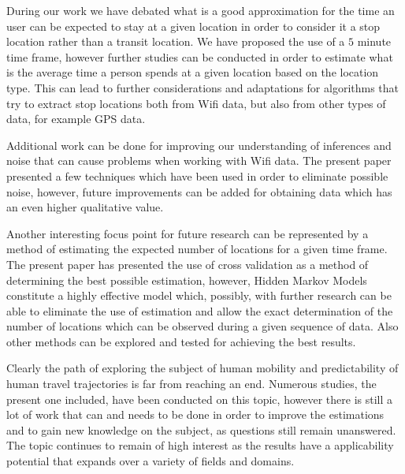 During our work we have debated what is a good approximation for the time an
user can be expected to stay at a given location in order to consider it a stop
location rather than a transit location. We have proposed the use of a $5$
minute time frame, however further studies can be conducted in order to estimate
what is the average time a person spends at a given location based on the
location type. This can lead to further considerations and adaptations for
algorithms that try to extract stop locations both from Wifi data, but also from
other types of data, for example GPS data.

Additional work can be done for improving our understanding of inferences and
noise that can cause problems when working with Wifi data. The present paper
presented a few techniques which have been used in order to eliminate possible
noise, however, future improvements can be added for obtaining data which has an
even higher qualitative value.

Another interesting focus point for future research can be represented by a
method of estimating the expected number of locations for a given time frame.
The present paper has presented the use of cross validation as a method of
determining the best possible estimation, however, Hidden Markov Models
constitute a highly effective model which, possibly, with further research can
be able to eliminate the use of estimation and allow the exact determination of
the number of locations which can be observed during a given sequence of data.
Also other methods can be explored and tested for achieving the best results.

Clearly the path of exploring the subject of human mobility and predictability
of human travel trajectories is far from reaching an end. Numerous studies, the
present one included, have been conducted on this topic, however there is still
a lot of work that can and needs to be done in order to improve the estimations
and to gain new knowledge on the subject, as questions still remain unanswered.
The topic continues to remain of high interest as the results have a
applicability potential that expands over a variety of fields and domains.
